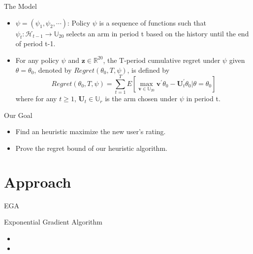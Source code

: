\documentclass[serif]{beamer}
\begin{document}
\begin{frame}{The Model}
\begin{itemize}
\item<1-> $\psi=(\psi_{1},\psi_{2},\cdots)$: Policy $\psi$ is a sequence of functions such that $\psi_{t}:\mathscr{H}_{t-1}\rightarrow \mathbb{U}_{20}$ selects an arm in period t based on the history until the end of period t-1.
\item<2-> For any policy $\psi$ and $\textbf{z}\in \mathbb{R}^{20}$, the T-period cumulative regret under $\psi$ given $\theta=\theta_{0}$, denoted by $Regret(\theta_{0},T,\psi)$, is defined by
\begin{equation}
Regret(\theta_{0},T,\psi)=\sum_{t=1}^{T}E\left[\max_{\textbf{v}\in \mathbb{U}_{20}}\textbf{v}^{'}\theta_{0}-\textbf{U}_{t}^{'}\theta_{0}|\theta=\theta_{0}\right] \nonumber
\end{equation}
where for any $t\geq 1$, $\textbf{U}_{t}\in \mathbb{U}_{r}$ is the arm chosen under $\psi$ in period t.


\end{itemize}
\end{frame}




\begin{frame}{Our Goal}
\begin{itemize}
\item<1-> Find an heuristic maximize the new user's rating.
\item<2-> Prove the regret bound of our heuristic algorithm.
\end{itemize}
\end{frame}


\section{Approach}
\tableofcontents[currentsection,subsectionstyle=hide]




\begin{frame}{EGA}

\begin{block}{Exponential Gradient Algorithm}
\begin{itemize}
\item 
\item 
\end{itemize}



\end{block}

\end{frame}
\end{document}
